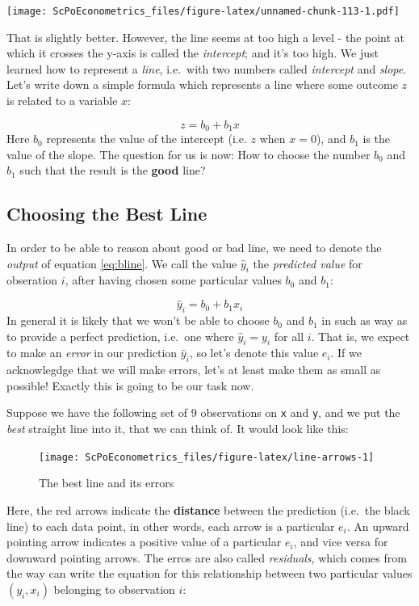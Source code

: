 \documentclass[]{book}
\theoremstyle{definition}
\theoremstyle{definition}
\theoremstyle{definition}
\theoremstyle{remark}
\begin{document}
\texttt{[image: ScPoEconometrics\_files/figure-latex/unnamed-chunk-113-1.pdf]}

That is slightly better. However, the line seems at too high a level -
the point at which it crosses the y-axis is called the \emph{intercept};
and it's too high. We just learned how to represent a \emph{line},
i.e.~with two numbers called \emph{intercept} and \emph{slope}. Let's
write down a simple formula which represents a line where some outcome
\(z\) is related to a variable \(x\):

\[
z = b_0 + b_1 x \label{eq:bline}
\] Here \(b_0\) represents the value of the intercept (i.e. \(z\) when
\(x=0\)), and \(b_1\) is the value of the slope. The question for us is
now: How to choose the number \(b_0\) and \(b_1\) such that the result
is the \textbf{good} line?

\subsection{Choosing the Best Line}\label{choosing-the-best-line}

In order to be able to reason about good or bad line, we need to denote
the \emph{output} of equation \eqref{eq:bline}. We call the value
\(\hat{y}_i\) the \emph{predicted value} for obseration \(i\), after
having chosen some particular values \(b_0\) and \(b_1\):

\[
\hat{y}_i = b_0 + b_1 x_i \label{eq:abline-pred}
\] In general it is likely that we won't be able to choose \(b_0\) and
\(b_1\) in such as way as to provide a perfect prediction, i.e.~one
where \(\hat{y}_i = y_i\) for all \(i\). That is, we expect to make an
\emph{error} in our prediction \(\hat{y}_i\), so let's denote this value
\(e_i\). If we acknowlegdge that we will make errors, let's at least
make them as small as possible! Exactly this is going to be our task
now.

Suppose we have the following set of 9 observations on \texttt{x} and
\texttt{y}, and we put the \emph{best} straight line into it, that we
can think of. It would look like this:

\begin{figure}

{\centering \texttt{[image: ScPoEconometrics\_files/figure-latex/line-arrows-1]} 

}

\caption{The best line and its errors}\label{fig:line-arrows}
\end{figure}

Here, the red arrows indicate the \textbf{distance} between the
prediction (i.e.~the black line) to each data point, in other words,
each arrow is a particular \(e_i\). An upward pointing arrow indicates a
positive value of a particular \(e_i\), and vice versa for downward
pointing arrows. The erros are also called \emph{residuals}, which comes
from the way can write the equation for this relationship between two
particular values \((y_i,x_i)\) belonging to observation \(i\):
\end{document}
